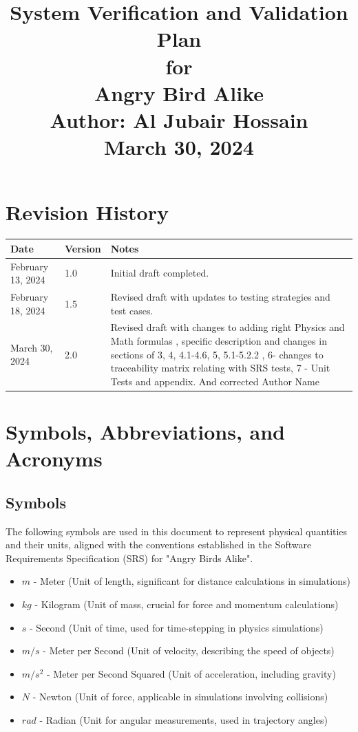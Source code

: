 \documentclass[12pt]{article}
\title{
    {\Huge System Verification and Validation Plan} \\
    {\Large for} \\
    {\LARGE Angry Bird Alike} \\
    \vspace{0.5em}
    {\Large Author: Al Jubair Hossain} \\
    \vspace{0.5em}
    {\large March 30, 2024}
}
\date{}
\begin{document}
\maketitle

\newpage

\section*{Revision History}
\begin{tabular}{|l|l|p{10cm}|}
    \hline
    \textbf{Date} & \textbf{Version} & \textbf{Notes} \\
    \hline
    February 13, 2024 & 1.0 & Initial draft completed. \\\hline
    February 18, 2024 & 1.5 & Revised draft with updates to testing strategies and test cases. \\\hline
    March 30, 2024 & 2.0 & Revised draft with changes to adding right Physics and Math formulas , specific description and changes in sections of 3, 4, 4.1-4.6, 5, 5.1-5.2.2 , 6- changes to traceability matrix relating with SRS tests, 7 - Unit Tests and appendix. And corrected Author Name \\
    \hline
\end{tabular}

\newpage

\tableofcontents

\newpage

\section{Symbols, Abbreviations, and Acronyms}

\subsection{Symbols}
The following symbols are used in this document to represent physical quantities and their units, aligned with the conventions established in the Software Requirements Specification (SRS) for "Angry Birds Alike".

\begin{itemize}
    \item \(m\) - Meter (Unit of length, significant for distance calculations in simulations)
    \item \(kg\) - Kilogram (Unit of mass, crucial for force and momentum calculations)
    \item \(s\) - Second (Unit of time, used for time-stepping in physics simulations)
    \item \(m/s\) - Meter per Second (Unit of velocity, describing the speed of objects)
    \item \(m/s^2\) - Meter per Second Squared (Unit of acceleration, including gravity)
    \item \(N\) - Newton (Unit of force, applicable in simulations involving collisions)
    \item \(rad\) - Radian (Unit for angular measurements, used in trajectory angles)
\end{itemize}
\end{document}
